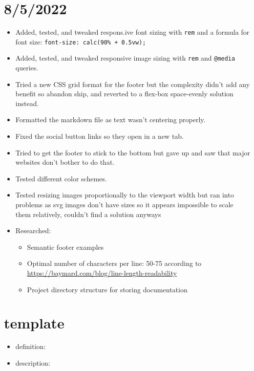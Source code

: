 \documentclass{article}
\begin{document}
\section*{8/5/2022}
\begin{itemize}
	\item Added, tested, and tweaked respons.ive font sizing with \texttt{rem} and a formula for font size: \texttt{font-size: calc(90\% + 0.5vw);} 
	\item Added, tested, and tweaked responsive image sizing with \texttt{rem} and \texttt{@media} queries. 
	\item Tried a new CSS grid format for the footer but the complexity didn't add any benefit so abandon ship, and reverted to a flex-box space-evenly solution instead.
	\item Formatted the markdown file as text wasn't centering properly.
	\item Fixed the social button links so they open in a new tab.
	\item Tried to get the footer to stick to the bottom but gave up and saw that major websites don't bother to do that.
	\item Tested different color schemes.
	\item Tested resizing images proportionally to the viewport width but ran into problems as svg images don't have sizes so it appears impossible to scale them relatively, couldn't find a solution anyways
	\item Researched:
		\begin{itemize} 
	 			\item Semantic footer examples
	 			\item Optimal number of characters per line: 50-75 according to \href{https://baymard.com/blog/line-length-readability}{https://baymard.com/blog/line-length-readability}
	 			\item Project directory structure for storing documentation
		\end{itemize}
\end{itemize}



\section*{template}
	
\begin{itemize}
	\item definition:
	\item description:
\end{itemize}


















































	
\end{document}
